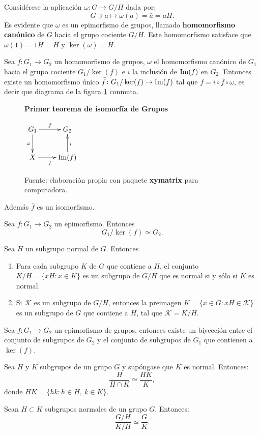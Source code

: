 Considérese la aplicación $\omega \colon G \to G/H$ dada por: \[G \ni a \mapsto \omega(a) = 	\bar{a} = aH. \]
Es evidente que $\omega$ es un epimorfismo de grupos, llamado \textbf{homomorfismo canónico} de $G$ hacia el grupo cociente $G/H$. Este homomorfismo satisface que $\omega(1) = 1H = H$ y $\ker(\omega) = H.$ 
\begin{teorema}
Sea $f \colon G_1  \to G_2$ un homomorfismo de grupos, $\omega$ el homomorfismo canónico de $G_1$ hacia el grupo cociente $G_1/\ker(f)$ e $i$ la inclusión de $\operatorname{Im}(f)$ en $G_2$. Entonces existe un homomorfismo único $\bar{f} \colon G_1/\ker(f) \to \operatorname{Im}(f)$ tal que $f = i \circ \bar{f}\circ \omega$, es decir que diagrama  de la figura \ref{fig:primerTeoremaIsomofia} conmuta.
\begin{figure}
\caption{\quad \textbf{Primer teorema de isomorfía de Grupos}}
\centering
$\xymatrix { G_1 \ar[r]^f 
\ar[d]_{\omega}
 & G_2\\
X \ar[r]_{\bar{f}} & \Ima(f) \ar[u]_i }$
\caption*{Fuente: elaboración propia con paquete \textbf{xymatrix} para computadora.}
\label{fig:primerTeoremaIsomofia}
\end{figure}
Además $\bar{f}$ es un isomorfismo. 
\end{teorema}
\begin{corolario}
Sea $f \colon G_1 \to G_2$ un epimorfismo. Entonces \[ G_1/\ker(f) \simeq G_2. \]
\end{corolario}
\begin{lema}
Sea $H$ un subgrupo normal de $G$. Entonces
\begin{enumerate}
\item Para cada subgrupo $K$ de $G$ que contiene a $H$, el conjunto $K/H = \{ xH \colon x \in K \}$ es un subgrupo de $G/H$ que es normal si y sólo si $K$ es normal.
\item Si $\mathcal{K}$ es un subgrupo de $G/H$, entonces la preimagen $K = \{ x \in G \colon xH \in \mathcal{K} \}$ es un subgrupo de $G$ que contiene a $H$, tal que $\mathcal{K} = K/H$.
\end{enumerate}
\end{lema}
\begin{teorema}
Sea $f \colon G_1 \to G_2$ un epimorfismo de grupos, entonces existe un biyección entre el conjunto de subgrupos de $G_2$ y el conjunto de subgrupos de $G_1$ que contienen a $\ker(f)$.
\end{teorema}
\begin{teorema}
Sea $H$ y $K$ subgrupos de un grupo $G$ y supóngase que $K$ es normal. Entonces: \[ \frac{H}{H \cap K} \simeq \frac{HK}{K}, \] donde $HK = \{ hk \colon h \in H, \ k \in K \}$.
\end{teorema}
\begin{teorema}
Sean $H \subset K$ subgrupos normales de un grupo $G$. Entonces:
\[\frac{G/H}{K/H} \simeq \frac{G}{K}. \]
\end{teorema}
